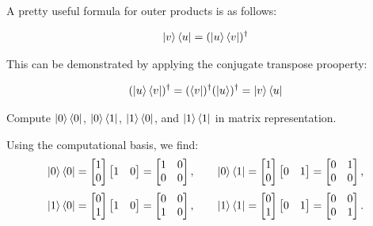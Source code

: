 \documentclass[12pt]{article}
\begin{document}
A pretty useful formula for outer products is as follows: 

$$\ket{v}\bra{u} = (\ket{u}\bra{v})^\dagger$$

This can be demonstrated by applying the conjugate transpose prooperty:

$$(\ket{u}\bra{v})^\dagger = (\bra{v})^\dagger (\ket{u})^\dagger = \ket{v}\bra{u}$$

\begin{example}
    Compute $\ket{0}\bra{0}$, $\ket{0}\bra{1}$, $\ket{1}\bra{0}$, and $\ket{1}\bra{1}$ in matrix representation. 
    
    Using the computational basis, we find:
    \[
        \ket{0}\bra{0}
        =
        \begin{bmatrix}
        1 \\
        0
        \end{bmatrix}
        \begin{bmatrix}
        1 & 0
        \end{bmatrix}
        =
        \begin{bmatrix}
        1 & 0 \\
        0 & 0
        \end{bmatrix},
        \qquad
        \ket{0}\bra{1}
        =
        \begin{bmatrix}
        1 \\
        0
        \end{bmatrix}
        \begin{bmatrix}
        0 & 1
        \end{bmatrix}
        =
        \begin{bmatrix}
        0 & 1 \\
        0 & 0
        \end{bmatrix},
    \]
    \[
        \ket{1}\bra{0}
        =
        \begin{bmatrix}
        0 \\
        1
        \end{bmatrix}
        \begin{bmatrix}
        1 & 0
        \end{bmatrix}
        =
        \begin{bmatrix}
        0 & 0 \\
        1 & 0
        \end{bmatrix},
        \qquad
        \ket{1}\bra{1}
        =
        \begin{bmatrix}
        0 \\
        1
        \end{bmatrix}
        \begin{bmatrix}
        0 & 1
        \end{bmatrix}
        =
        \begin{bmatrix}
        0 & 0 \\
        0 & 1
        \end{bmatrix}.
    \]
\end{example}
\end{document}
